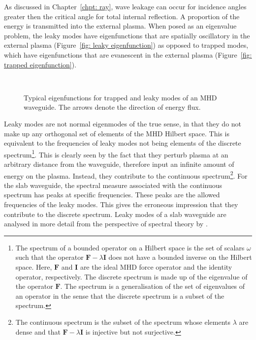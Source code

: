 \documentclass[12pt]{../style-files/ociamthesis}
\begin{document}
As discussed in Chapter~\ref{chpt: ray}, wave leakage can occur for incidence angles greater then the critical angle for total internal reflection. A proportion of the energy is transmitted into the external plasma. When posed as an eigenvalue problem, the leaky modes have eigenfunctions that are spatially oscillatory in the external plasma (Figure~\ref{fig: leaky eigenfunction}) as opposed to trapped modes, which have eigenfunctions that are evanescent in the external plasma (Figure~\ref{fig: trapped eigenfunction}).
\begin{figure}
	 \\
	\caption{Typical eigenfunctions for trapped and leaky modes of an MHD waveguide. The arrows denote the direction of energy flux.}
	\label{fig: eigenfunction}
\end{figure}
Leaky modes are not normal eigenmodes of the true sense, in that they do not make up any orthogonal set of elements of the MHD Hilbert space. This is equivalent to the frequencies of leaky modes not being elements of the discrete spectrum\footnote{The spectrum of a bounded operator on a Hilbert space is the set of scalars $\omega$ such that the operator $\mathbf{F} - \lambda\mathbf{I}$ does not have a bounded inverse on the Hilbert space. Here, $\mathbf{F}$ and $\mathbf{I}$ are the ideal MHD force operator and the identity operator, respectively. The discrete spectrum is made up of the eigenvalue of the operator $\mathbf{F}$. The spectrum is a generalisation of the set of eigenvalues of an operator in the sense that the discrete spectrum is a subset of the spectrum.}. This is clearly seen by the fact that they perturb plasma at an arbitrary distance from the waveguide, therefore input an infinite amount of energy on the plasma. Instead, they contribute to the continuous spectrum\footnote{The continuous spectrum is the subset of the spectrum whose elements $\lambda$ are dense and that $\mathbf{F} - \lambda\mathbf{I}$ is injective but not surjective.}. For the slab waveguide, the spectral measure associated with the continuous spectrum has peaks at specific frequencies. These peaks are the allowed frequencies of the leaky modes. This gives the erroneous impression that they contribute to the discrete spectrum. Leaky modes of a slab waveguide are analysed in more detail from the perspective of spectral theory by \cite{and_etal07}.
\end{document}
